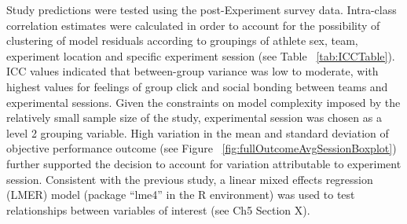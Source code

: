 \documentclass[english]{article}\usepackage[]{graphicx}\usepackage[]{color}
\makeatletter
\newenvironment{kframe}{%
 \def\at@end@of@kframe{}%
 \ifinner\ifhmode%
  \def\at@end@of@kframe{\end{minipage}}%
  \begin{minipage}{\columnwidth}%
 \fi\fi%
 \def\FrameCommand##1{\hskip\@totalleftmargin \hskip-\fboxsep
 \colorbox{shadecolor}{##1}\hskip-\fboxsep
     \hskip-\linewidth \hskip-\@totalleftmargin \hskip\columnwidth}%
 \MakeFramed {\advance\hsize-\width
   \@totalleftmargin\z@ \linewidth\hsize
   \@setminipage}}%
 {\par\unskip\endMakeFramed%
 \at@end@of@kframe}
\newenvironment{knitrout}{}{} %
\makeatother
\begin{document}
Study predictions were tested using the post-Experiment survey data.  Intra-class correlation estimates were calculated in order to account for the possibility of clustering of model residuals according to groupings of athlete sex, team, experiment location and specific experiment session (see Table ~\ref{tab:ICCTable}). ICC values indicated that between-group variance was low to moderate, with highest values for feelings of group click and social bonding between teams and experimental sessions. Given the constraints on model complexity imposed by the relatively small sample size of the study, experimental session was chosen as a level 2 grouping variable. High variation in the mean and standard deviation of objective performance outcome (see Figure ~\ref{fig:fullOutcomeAvgSessionBoxplot}) further supported the decision to account for variation attributable to experiment session. Consistent with the previous study, a linear mixed effects regression (LMER) model (package ``lme4'' in the R environment) was used to test relationships between variables of interest (see Ch5 Section X).


\begin{knitrout}
\color{fgcolor}\begin{kframe}


{\ttfamily\noindent{}}

{\ttfamily\noindent{}}

{\ttfamily\noindent{}}

{\ttfamily\noindent{}}\end{kframe}
\end{knitrout}
\end{document}
